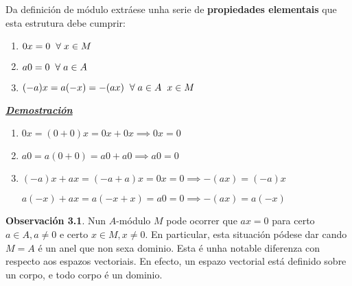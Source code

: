 \documentclass[twoside]{report}
\theoremstyle{mystyle}
\begin{document}
\pagebreak

\noindent Da definición de módulo extráese unha serie de \textbf{propiedades elementais} que esta estrutura debe cumprir:

\renewcommand{\theenumi}{\roman{enumi})}
\renewcommand{\labelenumi}{\theenumi}

\begin{enumerate}
    \item $0x = 0 \hspace{2mm} \forall \hspace{1mm} x \in M$
    \item $a0 = 0 \hspace{2mm} \forall \hspace{1mm} a \in A$
    \item $(-a)x = a(-x) = -(ax) \hspace{2mm} \forall \hspace{1mm} a \in A \hspace{2mm} x \in M$
\end{enumerate}

\vspace{2mm}

\noindent \textbf{\textit{\underline{Demostración}}}

\vspace{2mm}

\begin{enumerate}
    \item  $0x = (0 + 0)x = 0x + 0x \implies 0x = 0$
    \item $a0 = a(0 + 0) = a0 + a0 \implies a0 = 0$
    \item $(-a)x + ax = (-a + a)x = 0x = 0 \implies -(ax) = (-a)x$ \par
    \vspace{1mm}
    $a(-x) + ax = a(-x + x) = a0 = 0 \implies -(ax) = a(-x)$
\end{enumerate}

\renewcommand{\theenumi}{\arabic{enumi}}
\renewcommand{\labelenumi}{\theenumi.}

\vspace{3mm}

\noindent \textbf{Observación 3.1}. Nun $A$-módulo $M$ pode ocorrer que $ax = 0$ para certo $a \in A, a \neq 0$ e certo $x \in M, x \neq 0$. En particular, esta situación pódese dar cando $M = A$ é un anel que non sexa dominio. Esta é unha notable diferenza con respecto aos espazos vectoriais. En efecto, un espazo vectorial está definido sobre un corpo, e todo corpo é un dominio.\\
\end{document}
